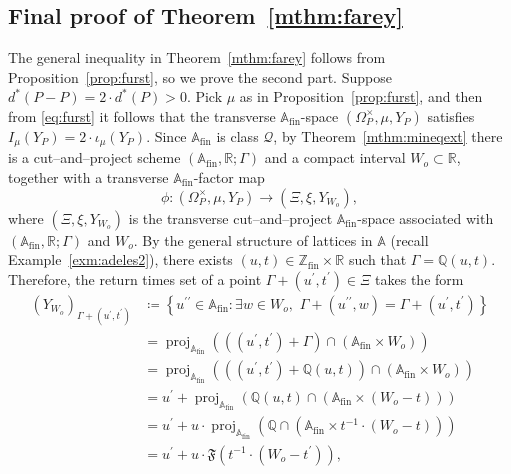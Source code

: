 \documentclass{amsart}
\numberwithin{equation}{subsection}
\theoremstyle{remark}
\begin{document}
\subsection{Final proof of Theorem~\ref{mthm:farey}}

The general inequality in Theorem~\ref{mthm:farey} follows from Proposition~\ref{prop:furst}, so we prove the second part. Suppose \(d^{\ast}\left(P-P\right)=2\cdot d^{\ast}\left(P\right)>0\). Pick \(\mu\) as in Proposition~\ref{prop:furst}, and then from \eqref{eq:furst} it follows that the transverse \(\mathbb{A}_{\mathrm{fin}}\)-space \(\left(\Omega_{P}^{\times},\mu,Y_{P}\right)\) satisfies \(I_{\mu}\left(Y_{P}\right)=2\cdot\iota_{\mu}\left(Y_{P}\right)\). Since \(\mathbb{A}_{\mathrm{fin}}\) is class \(\mathcal{Q}\), by Theorem~\ref{mthm:mineqext} there is a cut--and--project scheme \(\left(\mathbb{A}_{\mathrm{fin}},\mathbb{R};\Gamma\right)\) and a compact interval \(W_{o}\subset\mathbb{R}\), together with a transverse \(\mathbb{A}_{\mathrm{fin}}\)-factor map
\[\phi:\left(\Omega_{P}^{\times},\mu,Y_{P}\right)\to\left(\Xi,\xi,Y_{W_{o}}\right),\]
where \(\left(\Xi,\xi,Y_{W_{o}}\right)\) is the transverse cut--and--project \(\mathbb{A}_{\mathrm{fin}}\)-space associated with \(\left(\mathbb{A}_{\mathrm{fin}},\mathbb{R};\Gamma\right)\) and \(W_{o}\). By the general structure of lattices in \(\mathbb{A}\) (recall Example~\ref{exm:adeles2}), there exists \(\left(u,t\right)\in\mathbb{Z}_{\mathrm{fin}}\times\mathbb{R}\) such that \(\Gamma=\mathbb{Q}\left(u,t\right)\). Therefore, the return times set of a point \(\Gamma+\left(u^{\prime},t^{\prime}\right)\in\Xi\) takes the form
\begin{align*}
\left(Y_{W_{o}}\right)_{\Gamma+\left(u^{\prime},t^{\prime}\right)}
&\coloneqq\left\{u^{\prime\prime}\in\mathbb{A}_{\mathrm{fin}}:\exists w\in W_{o},\,\,\Gamma+\left(u^{\prime\prime},w\right)=\Gamma+\left(u^{\prime},t^{\prime}\right)\right\}\\
&=\operatorname{proj}_{\mathbb{A}_{\mathrm{fin}}}\left(\left(\left(u^{\prime},t^{\prime}\right)+\Gamma\right)\cap\left(\mathbb{A}_{\mathrm{fin}}\times W_{o}\right)\right)\\
&=\operatorname{proj}_{\mathbb{A}_{\mathrm{fin}}}\left(\left(\left(u^{\prime},t^{\prime}\right)+\mathbb{Q}\left(u,t\right)\right)\cap\left(\mathbb{A}_{\mathrm{fin}}\times W_{o}\right)\right)\\
&=u^{\prime}+\operatorname{proj}_{\mathbb{A}_{\mathrm{fin}}}\left(\mathbb{Q}\left(u,t\right)\cap\left(\mathbb{A}_{\mathrm{fin}}\times\left(W_{o}-t\right)\right)\right)\\
&=u^{\prime}+u\cdot\operatorname{proj}_{\mathbb{A}_{\mathrm{fin}}}\left(\mathbb{Q}\cap\left(\mathbb{A}_{\mathrm{fin}}\times t^{-1}\cdot\left(W_{o}-t\right)\right)\right)\\
&=u^{\prime}+u\cdot\mathfrak{F}\left(t^{-1}\cdot\left(W_{o}-t^{\prime}\right)\right),
\end{align*}
\end{document}
